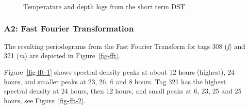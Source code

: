 \documentclass[
  authoryear,
  review,
  3p]{elsarticle}
\begin{document}
\begin{figure}
\begin{minipage}[t]{0.50\linewidth}
{\centering 


}

\end{minipage}%
%
\begin{minipage}[t]{0.50\linewidth}

{\centering 


}

\end{minipage}%

\caption{\label{fig-dstannex}Temperature and depth logs from the short
term DST.}

\end{figure}

\hypertarget{a2-fast-fourier-transformation}{%
\subsubsection*{\texorpdfstring{\textbf{A2}: Fast Fourier
Transformation}{A2: Fast Fourier Transformation}}\label{a2-fast-fourier-transformation}}

The resulting periodograms from the Fast Fourier Transform for tags 308
(\emph{f}) and 321 (\emph{m}) are depicted in Figure~\ref{fig-fft}.

Figure~\ref{fig-fft-1} shows spectral density peaks at about 12 hours
(highest), 24 hours, and smaller peaks at 23, 26, 6 and 8 hours. Tag 321
has the highest spectral density at 24 hours, then 12 hours, and small
peaks at 6, 23, 25 and 25 hours, see Figure~\ref{fig-fft-2}.
\end{document}
